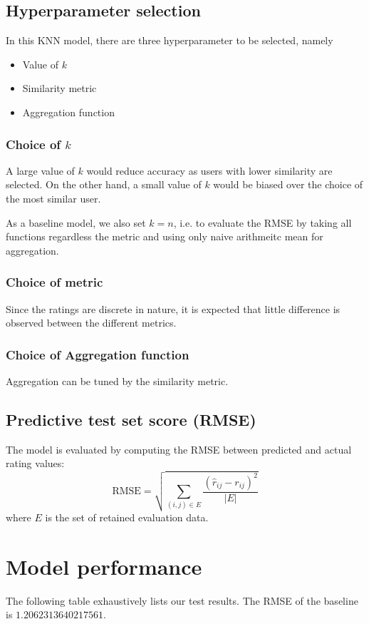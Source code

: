 \documentclass[final]{cvpr}
\begin{document}
\subsection{Hyperparameter selection}
In this KNN model, there are three hyperparameter to be selected, namely
\begin{itemize}
	\item Value of $k$
	\item Similarity metric
	\item Aggregation function
\end{itemize}

\subsubsection{Choice of $k$}
A large value of $k$ would reduce accuracy as users with lower similarity are selected.
On the other hand, a small value of $k$ would be biased over the choice of the most similar user.

As a baseline model, we also set $k=n$, i.e.
to evaluate the RMSE by taking all functions regardless the metric and using only naive arithmeitc mean for aggregation.


\subsubsection{Choice of metric}
Since the ratings are discrete in nature, it is expected that little difference is observed between the different metrics.

\subsubsection{Choice of Aggregation function}
Aggregation can be tuned by the similarity metric.

\subsection{Predictive test set score (RMSE)}
The model is evaluated by computing the RMSE between predicted and actual rating values:
$$ \text{RMSE} = \sqrt{\sum_{(i, j) \in E} \frac{{(\hat r_{ij} - r_{ij})}^2}{\left| E \right|}} $$
where $E$ is the set of retained evaluation data.

\section{Model performance}
The following table exhaustively lists our test results. The RMSE of the baseline is $1.2062313640217561$.
\end{document}

